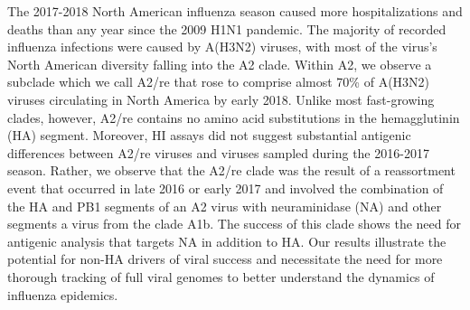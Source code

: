 The 2017-2018 North American influenza season caused more hospitalizations and deaths than any year since the 2009 H1N1 pandemic.
The majority of recorded influenza infections were caused by A(H3N2) viruses, with most of the virus's North American diversity falling into the A2 clade.
Within A2, we observe a subclade which we call A2/re that rose to comprise almost 70\% of A(H3N2) viruses circulating in North America by early 2018.
Unlike most fast-growing clades, however, A2/re contains no amino acid substitutions in the hemagglutinin (HA) segment.
Moreover, HI assays did not suggest substantial antigenic differences between A2/re viruses and viruses sampled during the 2016-2017 season.
Rather, we observe that the A2/re clade was the result of a reassortment event that occurred in late 2016 or early 2017 and involved the combination of the HA and PB1 segments of an A2 virus with neuraminidase (NA) and other segments a virus from the clade A1b.
The success of this clade shows the need for antigenic analysis that targets NA in addition to HA.
Our results illustrate the potential for non-HA drivers of viral success and necessitate the need for more thorough tracking of full viral genomes to better understand the dynamics of influenza epidemics.
